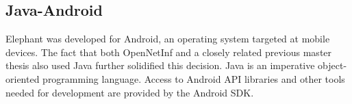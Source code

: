 \subsection{Java-Android}

Elephant was developed for Android, an operating system targeted at mobile devices. The fact that both OpenNetInf and a closely related previous master thesis \cite{hugomiguel} also used Java further solidified this decision. Java is an imperative object-oriented programming language. Access to Android API libraries and other tools needed for development are provided by the Android SDK.
